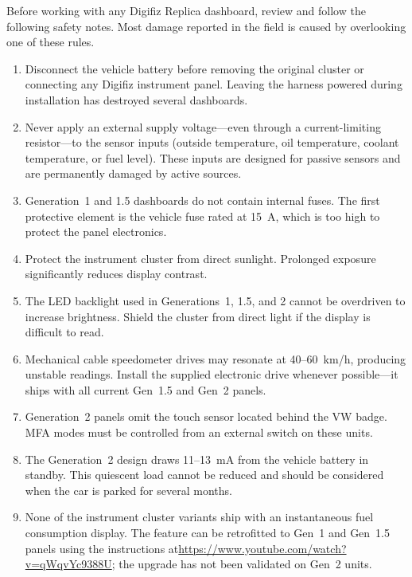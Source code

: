  \label{ch:precautions}

Before working with any Digifiz Replica dashboard, review and follow the following safety notes.
Most damage reported in the field is caused by overlooking one of these rules.

\begin{enumerate}
    \item Disconnect the vehicle battery before removing the original cluster or connecting any Digifiz instrument panel.
          Leaving the harness powered during installation has destroyed several dashboards.
    \item Never apply an external supply voltage---even through a current-limiting resistor---to the sensor inputs (outside temperature, oil temperature, coolant temperature, or fuel level).
          These inputs are designed for passive sensors and are permanently damaged by active sources.
    \item Generation~1 and 1.5 dashboards do not contain internal fuses.
          The first protective element is the vehicle fuse rated at 15~A, which is too high to protect the panel electronics.
    \item Protect the instrument cluster from direct sunlight.
          Prolonged exposure significantly reduces display contrast.
    \item The LED backlight used in Generations~1, 1.5, and 2 cannot be overdriven to increase brightness.
          Shield the cluster from direct light if the display is difficult to read.
    \item Mechanical cable speedometer drives may resonate at 40--60~km/h, producing unstable readings.
          Install the supplied electronic drive whenever possible---it ships with all current Gen~1.5 and Gen~2 panels.
    \item Generation~2 panels omit the touch sensor located behind the VW badge.
          MFA modes must be controlled from an external switch on these units.
    \item The Generation~2 design draws 11--13~mA from the vehicle battery in standby.
          This quiescent load cannot be reduced and should be considered when the car is parked for several months.
    \item None of the instrument cluster variants ship with an instantaneous fuel consumption display.
          The feature can be retrofitted to Gen~1 and Gen~1.5 panels using the instructions at\newline\url{https://www.youtube.com/watch?v=qWqvYc9388U}; the upgrade has not been validated on Gen~2 units.
\end{enumerate}

